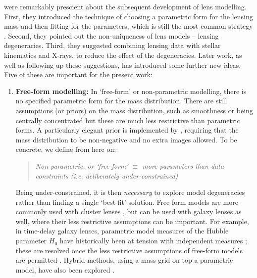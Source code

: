 \documentclass[galley,usenatbib]{mn2e}
\begin{document}
\cite{1981ApJ...244..736Y} were remarkably prescient about the subsequent
development of lens modelling.  First, they introduced the technique of
choosing a parametric form for the lensing mass and then fitting for the
parameters, which is still the most common strategy \citep[see for
example][]{2010GReGr..42.2151K,2011A&ARv..19...47K}.  Second, they pointed out
the non-uniqueness of lens models -- lensing degeneracies.  Third, they
suggested combining lensing data with stellar kinematics and X-rays, to reduce
the effect of the degeneracies.  Later work, as well as following up these
suggestions, has introduced some further new ideas.  Five of these are
important for the present work:
%
\begin{enumerate}
\item {\bf Free-form modelling:} In `free-form' or non-parametric
  modelling, there is no specified parametric form for the mass
  distribution.  There are still assumptions (or priors) on the mass
  distribution, such as smoothness or being centrally concentrated
  \citep{1997MNRAS.292..148S,2005MNRAS.360..477D,2009A&A...500..681M,2010ApJ...723.1678C}
  but these are much less restrictive than parametric forms.  A
  particularly elegant prior is implemented by
  \cite{2006MNRAS.367.1209L}, requiring that the mass distribution to
  be non-negative and no extra images allowed. To be concrete, we
  define from here on:
  
  \begin{quote}
  {\it Non-parametric, or `free-form' $\equiv$ more parameters than data constraints (i.e. deliberately under-constrained)}
  \end{quote}
  
  Being under-constrained, it is then {\it necessary} to explore model
  degeneracies rather than finding a single `best-fit'
  solution. Free-form models are more commonly used with cluster
  lenses
  \citep{2006ApJ...652L...5S,2009ApJ...690..154S,2009A&A...500..681M,2013arXiv1304.2393S},
  but can be used with galaxy lenses as well, where their less
  restrictive assumptions can be important.  For example, in
  time-delay galaxy lenses, parametric model measures of the Hubble parameter $H_0$ have historically been at 
  tension with independent measures 
  \citep[e.g.][]{2002astro.ph..4043K,2002ApJ...578...25K}; these are
  resolved once the less restrictive assumptions of free-form models
  are permitted \citep{2007ApJ...667..645R}.  Hybrid methods, using a
  mass grid on top a parametric model, have also been explored
  \citep[e.g.,][]{2010MNRAS.408.1969V}.


\end{enumerate}
\end{document}
